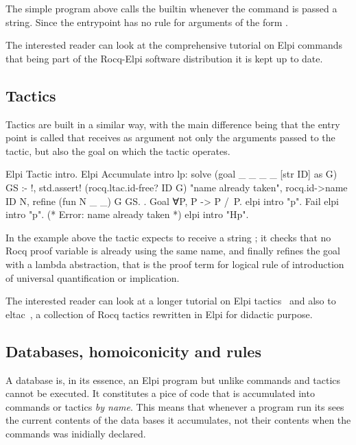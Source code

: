 \documentclass[a4paper, 11pt]{book}
\begin{document}
The simple program above calls the  builtin whenever the
command is passed a string. Since the entrypoint  has
no rule for arguments of the form .

The interested reader can look at the comprehensive tutorial on Elpi
commands~\cite{tuto:commands} that being part of the Rocq-Elpi software
distribution it is kept up to date.

\subsection{Tactics}

Tactics are built in a similar way, with the main difference being that
the entry point is called  that receives as
argument not only the arguments passed to the tactic, but also the goal
on which the tactic operates.

\begin{rocqcode}
Elpi Tactic intro.
Elpi Accumulate intro lp:{{
  solve (goal _ _ _ _ [str ID] as G) GS :- !,
    std.assert! (rocq.ltac.id-free? ID G) "name already taken",
    rocq.id->name ID N,
    refine (fun N _ _) G GS.
}}.
Goal ∀P, P -> P /\ P.
elpi intro "p".
Fail elpi intro "p". (* Error: name already taken *)
elpi intro "Hp".
\end{rocqcode}

In the example above the tactic expects to receive a string ;
it checks that no Rocq proof variable is already using the same name, and
finally refines the goal with a lambda abstraction, that is the proof term
for logical rule of introduction of universal quantification or implication.
  
The interested reader can look at a longer tutorial on Elpi tactics~\cite{tuto:tactics}
and also to eltac~\cite{app:eltac}, a collection of Rocq tactics rewritten in Elpi for
didactic purpose.

\subsection{Databases, homoiconicity and rules}\label{sec:homo}

A database is, in its essence, an Elpi program but unlike commands and
tactics cannot be executed. It constitutes a pice of code that is
accumulated into commands or tactics \emph{by name}. This means that
whenever a program run its sees the current contents of the data bases
it accumulates, not their contents when the commands was inidially declared.
\end{document}
